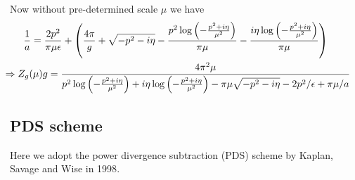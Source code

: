 \documentclass{article}
\begin{document}
Now without pre-determined scale $\mu$ we have
\begin{align}
    \frac{1}{a} & =\frac{2 p^2}{\pi  \mu  \epsilon }+\left(\frac{4 \pi }{g}+\sqrt{-p^2-i \eta }-\frac{p^2 \log \left(-\frac{p^2+i \eta }{\mu ^2}\right)}{\pi  \mu }-\frac{i \eta  \log \left(-\frac{p^2+i \eta }{\mu ^2}\right)}{\pi  \mu }\right)                       \\
                & \hspace{-0.4in}\Rightarrow Z_g(\mu)g=\frac{4 \pi ^2 \mu  }{p^2 \log \left(-\frac{p^2+i \eta }{\mu ^2}\right)+i \eta  \log \left(-\frac{p^2+i \eta }{\mu ^2}\right)-\pi \mu  \sqrt{-p^2-i \eta }-2 p^2/\epsilon+\pi  \mu  /a}
\end{align}
\subsection{PDS scheme}
Here we adopt the power divergence subtraction (PDS) scheme by Kaplan, Savage and Wise in 1998\cite{Kaplan:1998tg}. 

\appendix



% 

\end{document}
